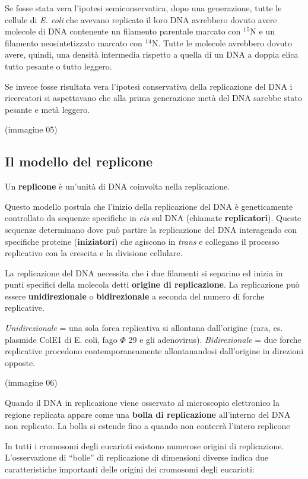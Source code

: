 \documentclass[11pt]{book}
\begin{document}
Se fosse stata vera l'ipotesi semiconservatica, dopo una generazione,
tutte le cellule di \emph{E. coli} che avevano replicato il loro DNA
avrebbero dovuto avere molecole di DNA contenente un filamento parentale
marcato con \(^1\)\(^5\)N e un filamento neosintetizzato marcato con
\(^1\)\(^4\)N. Tutte le molecole avrebbero dovuto avere, quindi, una
densità intermedia rispetto a quella di un DNA a doppia elica tutto
pesante o tutto leggero.

Se invece fosse risultata vera l'ipotesi conservativa della replicazione
del DNA i ricercatori si aspettavano che alla prima generazione metà del
DNA sarebbe stato pesante e metà leggero.

(immagine 05)

\subsection{Il modello del replicone}\label{il-modello-del-replicone}

Un \textbf{replicone} è un'unità di DNA coinvolta nella replicazione.

Questo modello postula che l'inizio della replicazione del DNA è
geneticamente controllato da sequenze specifiche in \emph{cis} sul DNA
(chiamate \textbf{replicatori}). Queste sequenze determinano dove può
partire la replicazione del DNA interagendo con specifiche proteine
(\textbf{iniziatori}) che agiscono in \emph{trans} e collegano il
processo replicativo con la crescita e la divisione cellulare.

La replicazione del DNA necessita che i due filamenti si separino ed
inizia in punti specifici della molecola detti \textbf{origine di
replicazione}. La replicazione può essere \textbf{unidirezionale} o
\textbf{bidirezionale} a seconda del numero di forche replicative.

\emph{Unidirezionale} = una sola forca replicativa si allontana
dall'origine (rara, es. plasmide ColE1 di E. coli, fago \(\Phi\) 29 e
gli adenovirus). \emph{Bidirezionale} = due forche replicative procedono
contemporaneamente allontanandosi dall'origine in direzioni opposte.

(immagine 06)

Quando il DNA in replicazione viene osservato al microscopio elettronico
la regione replicata appare come una \textbf{bolla di replicazione}
all'interno del DNA non replicato. La bolla si estende fino a quando non
conterrà l'intero replicone

In tutti i cromosomi degli eucarioti esistono numerose origini di
replicazione. L'osservazione di ``bolle'' di replicazione di dimensioni
diverse indica due caratteristiche importanti delle origini dei
cromosomi degli eucarioti:
\end{document}
